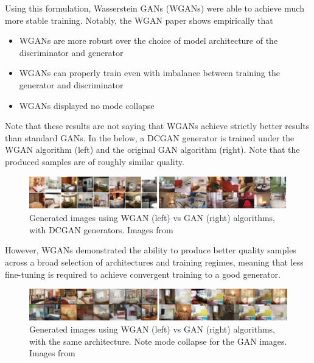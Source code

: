 Using this formulation, Wasserstein GANs (WGANs) were able to achieve much more stable training. Notably, the WGAN paper shows empirically that
\begin{itemize}
    \item WGANs are more robust over the choice of model architecture of the discriminator and generator
    \item WGANs can properly train even with imbalance between training the generator and discriminator
    \item WGANs displayed no mode collapse
\end{itemize}
Note that these results are not saying that WGANs achieve strictly better results than standard GANs. In the below, a DCGAN generator is trained under the WGAN algorithm (left) and the original GAN algorithm (right). Note that the produced samples are of roughly similar quality.

\begin{figure}[h]
\centering
  \includegraphics[scale=0.7]{chapter_14/files/wgan_equal.png}
  \caption{Generated images using WGAN (left) vs GAN (right) algorithms, with DCGAN generators. Images from \cite{arjovsky2017wasserstein}}
\end{figure}

However, WGANs demonstrated the ability to produce better quality samples across a broad selection of architectures and training regimes, meaning that less fine-tuning is required to achieve convergent training to a good generator.

\begin{figure}[h]
\centering
  \includegraphics[scale=0.7]{chapter_14/files/wgan_improved.png}
  \caption{Generated images using WGAN (left) vs GAN (right) algorithms, with the same architecture. Note mode collapse for the GAN images. Images from \cite{arjovsky2017wasserstein}}
\end{figure}